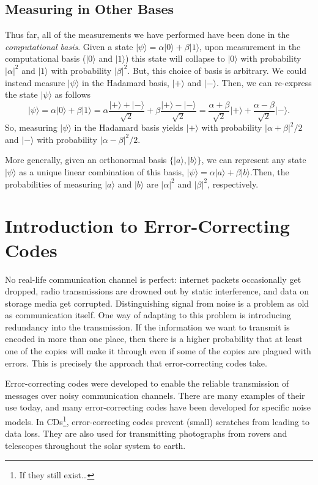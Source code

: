 \documentclass[12pt,twoside]{reedthesis}
\theoremstyle{definition}
\newcommand{\ketz}{\ensuremath{\lvert 0\rangle}\xspace}
\newcommand{\keto}{\ensuremath{\lvert 1\rangle}\xspace}
\newcommand{\ket}[1]{\ensuremath{\lvert #1\rangle}\xspace}
\newcommand{\Hplus}{\ensuremath{\lvert + \rangle}\xspace}
\newcommand{\Hminus}{\ensuremath{\lvert- \rangle}\xspace}
\begin{document}
\section{Measuring in Other Bases}
Thus far, all of the measurements we have performed have been done in the \textit{computational basis}. Given a state $\ket{\psi} = \alpha\ketz + \beta\keto$, upon measurement in the computational basis ($\ketz$ and $\keto$) this state will collapse to $\ketz$ with probability $\lvert \alpha \rvert^2$ and $\keto$ with probability  $\lvert \beta \rvert^2.$ But, this choice of basis is arbitrary. We could instead measure $\ket{\psi}$ in the Hadamard basis, $\Hplus$ and $\Hminus$. Then, we can re-express the state $\ket{\psi}$ as follows
\begin{equation*}
\ket{\psi} = \alpha\ketz + \beta\keto = \alpha \frac{\Hplus + \Hminus}{\sqrt{2}} + \beta \frac{\Hplus - \Hminus}{\sqrt{2}} = \frac{\alpha + \beta}{\sqrt{2}} \Hplus + \frac{\alpha - \beta}{\sqrt{2}} \Hminus.
\end{equation*}
So, measuring $\ket{\psi}$ in the Hadamard basis yields $\Hplus$ with probability $\lvert \alpha + \beta \rvert^2/2$ and $\Hminus$ with probability $\lvert\alpha - \beta\rvert^2/2$.

More generally, given an orthonormal basis $\{\ket{a}, \ket{b}\}$, we can represent any state $\ket{\psi}$ as a unique linear combination of this basis, $\ket{\psi} = \alpha \ket{a}+ \beta \ket{b}$.Then, the probabilities of measuring $\ket{a}$ and $\ket{b}$ are $\lvert \alpha\rvert^2$ and $\lvert\beta\rvert^2$, respectively.


\chapter{Introduction to Error-Correcting Codes}	

No real-life communication channel is perfect: internet packets occasionally get dropped, radio transmissions are drowned out by static interference, and data on storage media get corrupted. Distinguishing signal from noise is a problem as old as communication itself. One way of adapting to this problem is introducing redundancy into the transmission. If the information we want to transmit is encoded in more than one place, then there is a higher probability that at least one of the copies will make it through even if some of the copies are plagued with errors. This is precisely the approach that error-correcting codes take. 


Error-correcting codes were developed to enable the reliable transmission of messages over noisy communication channels. There are many examples of their use today, and many error-correcting codes have been developed for specific noise models. In CDs\footnote{If they still exist\ldots}, error-correcting codes prevent (small) scratches from leading to data loss. They are also used for transmitting photographs from rovers and telescopes throughout the solar system to earth. 
\end{document}
